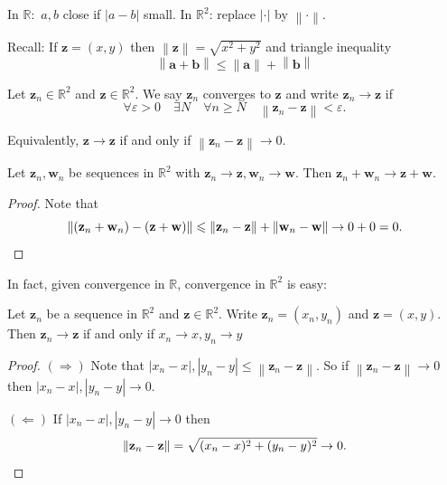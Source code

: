\documentclass[a4paper]{article}
\renewcommand{\epsilon}{\varepsilon}
\begin{document}
In $\mathbb{R}:$ $a,b$ close if $|a-b|$ small. In $ \mathbb{R}^{2} $: replace $ |\cdot | $ by $ \left\| \cdot  \right\| $. 

Recall: If $\mathbf{z}=(x,y)$ then $ \left\| \mathbf{z} \right\| = \sqrt{x^2+y^2} $ and triangle inequality
\[
    \left\| \mathbf{a}+\mathbf{b} \right\| \le \left\| \mathbf{a} \right\| + \left\| \mathbf{b} \right\|
\]

\begin{definition}
    Let $\mathbf{z}_n\in \mathbb{R}^{2}$ and $\mathbf{z}\in \mathbb{R}^{2}$. We say $ \mathbf{z}_n $ converges to $\mathbf{z}$ and write $\mathbf{z}_n\to \mathbf{z}$ if 
    \[
        \forall \epsilon>0\quad \exists N\quad \forall n\ge N\quad \left\| \mathbf{z}_n-\mathbf{z} \right\| < \epsilon. 
    \]
\end{definition}
\begin{note}
    Equivalently, $ \mathbf{z}\to \mathbf{z} $ if and only if $ \left\| \mathbf{z}_n-\mathbf{z} \right\|\to 0 $. 
\end{note}

\begin{example}
    Let $ \mathbf{z}_n,\mathbf{w}_n $ be sequences in $ \mathbb{R}^{2} $ with $ \mathbf{z}_n\to \mathbf{z},\mathbf{w}_n\to \mathbf{w} $. Then $ \mathbf{z}_n+\mathbf{w}_n\to \mathbf{z}+\mathbf{w} $. 

    \begin{proof}
        Note that 
        \[
            \left\| (\mathbf{z}_n+\mathbf{w}_n)-(\mathbf{z}+\mathbf{w}) \right\|\le \left\| \mathbf{z}_n-\mathbf{z} \right\| + \left\| \mathbf{w}_n-\mathbf{w} \right\|\to 0+0=0. \qedhere
        \]
    \end{proof}
\end{example}
In fact, given convergence in $\mathbb{R}$, convergence in $ \mathbb{R}^{2} $ is easy: 
\begin{proposition}
    Let $ \mathbf{z}_n $ be a sequence in $ \mathbb{R}^{2} $ and $\mathbf{z}\in \mathbb{R}^{2}$. Write $ \mathbf{z}_n = (x_n,y_n) $ and $\mathbf{z} = (x,y)$. Then $ \mathbf{z}_n\to \mathbf{z} $ if and only if $ x_n\to x,y_n\to y $ 
\end{proposition}
\begin{proof}
    $ (\Rightarrow) $ Note that $ |x_n-x|,|y_n-y|\le \left\| \mathbf{z}_n-\mathbf{z} \right\| $. So if $ \left\| \mathbf{z}_n-\mathbf{z} \right\|\to 0 $ then $ |x_n-x|,|y_n-y|\to 0 $. 

    $ ( \Leftarrow) $ If $ |x_n-x|,|y_n-y|\to 0 $ then 
    \[
        \left\| \mathbf{z}_n-\mathbf{z} \right\| = \sqrt{(x_n-x)^2 + (y_n-y)^2}\to 0.\qedhere
    \]
\end{proof}
\end{document}

